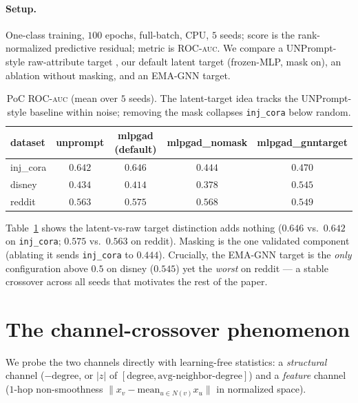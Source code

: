 \documentclass[11pt]{article}
\newcommand{\auc}{\textsc{auc}}
\begin{document}
\paragraph{Setup.} One-class training, $100$ epochs, full-batch, CPU, $5$ seeds; score is the
rank-normalized predictive residual; metric is ROC-\auc{}. We compare a UNPrompt-style
raw-attribute target \citep{niu2024unprompt}, our default latent target (frozen-MLP, mask on),
an ablation without masking, and an EMA-GNN target.

\begin{table}[t]
\centering
\caption{PoC ROC-\auc{} (mean over $5$ seeds). The latent-target idea tracks the UNPrompt-style
baseline within noise; removing the mask collapses \texttt{inj\_cora} below random.}
\label{tab:poc}
\begin{tabular}{lcccc}
\toprule
dataset & unprompt & mlpgad (default) & mlpgad\_nomask & mlpgad\_gnntarget \\
\midrule
inj\_cora & $0.642$ & $\mathbf{0.646}$ & $0.444$ & $0.470$ \\
disney   & $0.434$ & $0.414$ & $0.378$ & $\mathbf{0.545}$ \\
reddit   & $0.563$ & $\mathbf{0.575}$ & $0.568$ & $0.549$ \\
\bottomrule
\end{tabular}
\end{table}

Table~\ref{tab:poc} shows the latent-vs-raw target distinction adds nothing
($0.646$ vs.\ $0.642$ on \texttt{inj\_cora}; $0.575$ vs.\ $0.563$ on reddit). Masking is the
one validated component (ablating it sends \texttt{inj\_cora} to $0.444$). Crucially, the EMA-GNN
target is the \emph{only} configuration above $0.5$ on disney ($0.545$) yet the \emph{worst} on
reddit --- a stable crossover across all seeds that motivates the rest of the paper.

\section{The channel-crossover phenomenon}
\label{sec:channels}

We probe the two channels directly with learning-free statistics: a \emph{structural} channel
($-\text{degree}$, or $|z|$ of $[\text{degree}, \text{avg-neighbor-degree}]$) and a
\emph{feature} channel ($1$-hop non-smoothness $\lVert x_v - \mathrm{mean}_{u\in N(v)} x_u
\rVert$ in normalized space).
\end{document}
